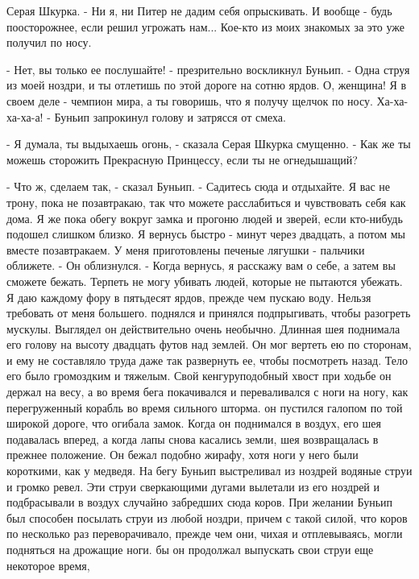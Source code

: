 Серая Шкурка. - Ни я, ни Питер не дадим себя опрыскивать. И вообще - 
будь поосторожнее, если решил угрожать нам... Кое-кто из моих знакомых 
за это уже получил по носу.
\par- Нет, вы только ее послушайте! - презрительно воскликнул Буньип. 
- Одна струя из моей ноздри, и ты отлетишь по этой дороге на сотню 
ярдов. О, женщина! Я в своем деле - чемпион мира, а ты говоришь, что я 
получу щелчок по носу. Ха-ха-ха-ха-а! - Буньип запрокинул голову и 
затрясся от смеха.
\par- Я думала, ты выдыхаешь огонь, - сказала Серая Шкурка смущенно. - 
Как же ты можешь сторожить Прекрасную Принцессу, если ты не 
огнедышащий?
\par- Что ж, сделаем так, - сказал Буньип. - Садитесь сюда и 
отдыхайте. Я вас не трону, пока не позавтракаю, так что можете 
расслабиться и чувствовать себя как дома. Я же пока обегу вокруг замка 
и прогоню людей и зверей, если кто-нибудь подошел слишком близко. Я 
вернусь быстро - минут через двадцать, а потом мы вместе позавтракаем. 
У меня приготовлены печеные лягушки - пальчики оближете. - Он 
облизнулся. - Когда вернусь, я расскажу вам о себе, а затем вы сможете 
бежать. Терпеть не могу убивать людей, которые не пытаются убежать. Я 
даю каждому фору в пятьдесят ярдов, прежде чем пускаю воду. Нельзя 
требовать от меня большего.
 поднялся и принялся подпрыгивать, чтобы разогреть мускулы. 
Выглядел он действительно очень необычно. Длинная шея поднимала его 
голову на высоту двадцать футов над землей. Он мог вертеть ею по 
сторонам, и ему не составляло труда даже так развернуть ее, чтобы 
посмотреть назад. Тело его было громоздким и тяжелым. Свой 
кенгуруподобный хвост при ходьбе он держал на весу, а во время бега 
покачивался и переваливался с ноги на ногу, как перегруженный корабль 
во время сильного шторма.
 он пустился галопом по той широкой дороге, что огибала 
замок. Когда он поднимался в воздух, его шея подавалась вперед, а 
когда лапы снова касались земли, шея возвращалась в прежнее положение. 
Он бежал подобно жирафу, хотя ноги у него были короткими, как у 
медведя. На бегу Буньип выстреливал из ноздрей водяные струи и громко 
ревел. Эти струи сверкающими дугами вылетали из его ноздрей и 
подбрасывали в воздух случайно забредших сюда коров. При желании 
Буньип был способен посылать струи из любой ноздри, причем с такой 
силой, что коров по несколько раз переворачивало, прежде чем они, 
чихая и отплевываясь, могли подняться на дрожащие ноги.
 бы он продолжал выпускать свои струи еще некоторое время, 
